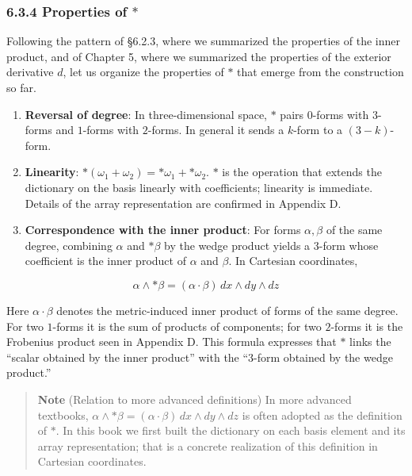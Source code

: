 \hypertarget{properties-of-ast}{%
\subsubsection{\texorpdfstring{6.3.4 Properties of
\(\ast\)}{6.3.4 Properties of \textbackslash ast}}\label{properties-of-ast}}

Following the pattern of §6.2.3, where we summarized the properties of
the inner product, and of Chapter 5, where we summarized the properties
of the exterior derivative \(d\), let us organize the properties of
\(\ast\) that emerge from the construction so far.

\begin{enumerate}
\def\labelenumi{\arabic{enumi}.}
\item
  \textbf{Reversal of degree}: In three-dimensional space, \(\ast\)
  pairs \(0\)-forms with \(3\)-forms and \(1\)-forms with \(2\)-forms.
  In general it sends a \(k\)-form to a \((3-k)\)-form.
\item
  \textbf{Linearity}:
  \(\ast(\omega_1 + \omega_2) = \ast\omega_1 + \ast\omega_2\). \(\ast\)
  is the operation that extends the dictionary on the basis linearly
  with coefficients; linearity is immediate. Details of the array
  representation are confirmed in Appendix D.
\item
  \textbf{Correspondence with the inner product}: For forms
  \(\alpha, \beta\) of the same degree, combining \(\alpha\) and
  \(\ast\beta\) by the wedge product yields a \(3\)-form whose
  coefficient is the inner product of \(\alpha\) and \(\beta\). In
  Cartesian coordinates,
\end{enumerate}

\[
\alpha \wedge \ast\beta
=
(\alpha\cdot\beta)\,dx\wedge dy\wedge dz
\]

Here \(\alpha\cdot\beta\) denotes the metric-induced inner product of
forms of the same degree. For two \(1\)-forms it is the sum of products
of components; for two \(2\)-forms it is the Frobenius product seen in
Appendix D. This formula expresses that \(\ast\) links the ``scalar
obtained by the inner product'' with the ``\(3\)-form obtained by the
wedge product.''

\begin{quote}
\textbf{Note} (Relation to more advanced definitions) In more advanced
textbooks,
\(\alpha\wedge\ast\beta=(\alpha\cdot\beta)\,dx\wedge dy\wedge dz\) is
often adopted as the definition of \(\ast\). In this book we first built
the dictionary on each basis element and its array representation; that
is a concrete realization of this definition in Cartesian coordinates.
\end{quote}

